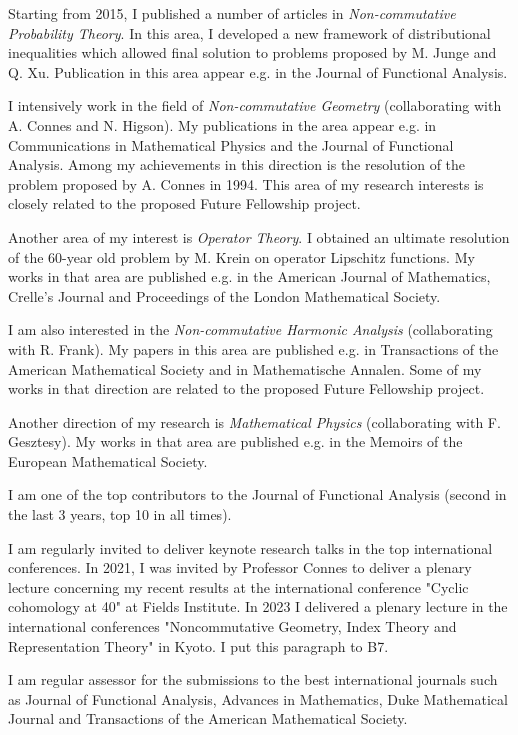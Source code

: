 \documentclass[12pt]{article}
\begin{document}
Starting from 2015, I published a number of articles in {\it Non-commutative Probability Theory}. In this area, I developed a new framework of distributional inequalities which allowed final solution to problems proposed by M. Junge and Q. Xu. Publication in this area appear e.g. in the Journal of Functional Analysis. 

I intensively work in the field of {\it Non-commutative Geometry} (collaborating with A. Connes and N. Higson). My publications in the area appear e.g. in Communications in Mathematical Physics and the Journal of Functional Analysis. Among my achievements in this direction is the resolution of the problem proposed by A. Connes in 1994. This area of my research interests is closely related to the proposed Future Fellowship project.

Another area of my interest is {\it Operator Theory}. I obtained an ultimate resolution of the 60-year old problem by M. Krein on operator Lipschitz functions. My works in that area are published e.g. in the  American Journal of Mathematics, Crelle's Journal and Proceedings of the London Mathematical Society.

I am also interested in the {\it Non-commutative Harmonic Analysis} (collaborating  with R. Frank). My papers in this area are published e.g. in Transactions of the American Mathematical Society and in Mathematische Annalen. Some of my works in that direction are related to the proposed Future Fellowship project.

Another direction of my research is {\it Mathematical Physics} (collaborating with F. Gesztesy). My works in that area are published e.g. in the Memoirs of the European Mathematical Society.

I am one of the top contributors to the Journal of Functional Analysis (second in the last 3 years, top 10 in all times). 

I am regularly invited to deliver keynote research talks in the top international conferences. In 2021, I was invited by Professor Connes to deliver a plenary lecture concerning my recent results at the international conference "Cyclic cohomology at 40" at Fields Institute. In 2023 I delivered a plenary lecture in the international conferences "Noncommutative Geometry, Index Theory and Representation Theory" in Kyoto. {\color{red} I put this paragraph to B7. }

I am regular assessor for the submissions to the best international journals such as Journal of Functional Analysis, Advances in Mathematics, Duke Mathematical Journal and Transactions of the American Mathematical Society.
\end{document}
